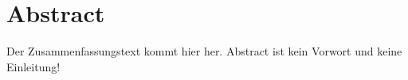 \chapter*{Abstract}
Der Zusammenfassungstext kommt hier her. Abstract ist kein Vorwort und keine
Einleitung! 
